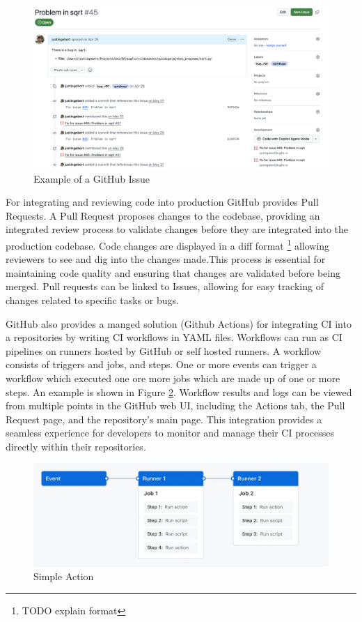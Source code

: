 \begin{figure}[H]
    \centering
    \includegraphics[width=1\textwidth]{images/github/GitHub Issue.png}
    \caption{Example of a GitHub Issue}
    \label{fig:gh-issue}
\end{figure}

For integrating and reviewing code into production GitHub provides Pull Requests. A Pull Request proposes changes to the codebase, providing an integrated review process to validate changes before they are integrated into the production codebase. Code changes are displayed in a diff format \footnote{TODO explain format} allowing reviewers to see and dig into the changes made.This process is essential for maintaining code quality and ensuring that changes are validated before being merged. %
Pull requests can be linked to Issues, allowing for easy tracking of changes related to specific tasks or bugs. %

GitHub also provides a manged solution (Github Actions) for integrating CI into a repositories by writing CI workflows in YAML files. Workflows can run as CI pipelines on runners hosted by GitHub or self hosted runners. A workflow consists of triggers and jobs, and steps. One or more events can trigger a workflow which executed one ore more jobs which are made up of one or more steps. \cite{Workflows} An example is shown in Figure \ref{fig:gh-workflow}. Workflow results and logs can be viewed from multiple points in the GitHub web UI, including the Actions tab, the Pull Request page, and the repository's main page. This integration provides a seamless experience for developers to monitor and manage their CI processes directly within their repositories.

\begin{figure}[H]
    \centering
    \includegraphics[width=1\textwidth]{images/overview-actions-simple.png}
    \caption{Simple Action}
    \label{fig:gh-workflow}
\end{figure}

